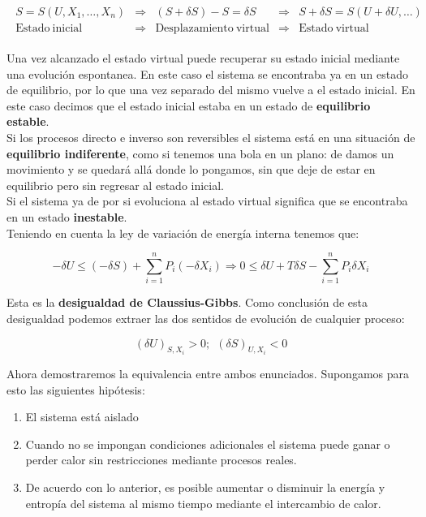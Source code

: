 \documentclass[12pt,a4paper]{article}
\begin{document}
\begin{gather}
\begin{array}{ccccc}
S = S(U,X_1, \ldots, X_n) & \Longrightarrow & (S + \delta S) - S = \delta S & \Longrightarrow & S + \delta S = S(U+\delta U ,\ldots)\\
\mathrm{Estado \ inicial} & \Longrightarrow & \mathrm{Desplazamiento \ virtual} & \Longrightarrow & \mathrm{Estado \ virtual}
\end{array}
\end{gather}


Una vez alcanzado el estado virtual puede recuperar su estado inicial mediante una evolución espontanea. En este caso el sistema se encontraba ya en un estado de equilibrio, por lo que una vez separado del mismo vuelve a el estado inicial. En este caso decimos que el estado inicial estaba en un estado de \textbf{equilibrio estable}. \\

Si los procesos directo e inverso son reversibles el sistema está en una situación de \textbf{equilibrio indiferente}, como si tenemos una bola en un plano: de damos un movimiento y se quedará allá donde lo pongamos, sin que deje de estar en equilibrio pero sin regresar al estado inicial. \\

Si el sistema ya de por si evoluciona al estado virtual significa que se encontraba en un estado \textbf{inestable}. \\

Teniendo en cuenta la ley de variación de energía interna tenemos que:

\begin{equation}
- \delta U \leq  ( - \delta S) + \sum_{i=1}^n P_i (-\delta X_i) \Longrightarrow 0 \leq \delta U +  T \delta S - \sum_{i=1}^n P_i \delta X_i
\end{equation}

Esta es la \textbf{desigualdad de Claussius-Gibbs}. Como conclusión de esta desigualdad podemos extraer las dos sentidos de evolución de cualquier proceso:

\begin{equation}
(\delta U)_{S,X_i} > 0; \ \ (\delta S)_{U,X_i} < 0
\end{equation}

Ahora demostraremos la equivalencia entre ambos enunciados. Supongamos para esto las siguientes hipótesis:

\begin{enumerate}
\item El sistema está aislado
\item Cuando no se impongan condiciones adicionales el sistema puede ganar o perder calor sin restricciones mediante procesos reales.
\item De acuerdo con lo anterior, es posible aumentar o disminuir la energía y entropía del sistema al mismo tiempo mediante el intercambio de calor.
\end{enumerate}
\end{document}
